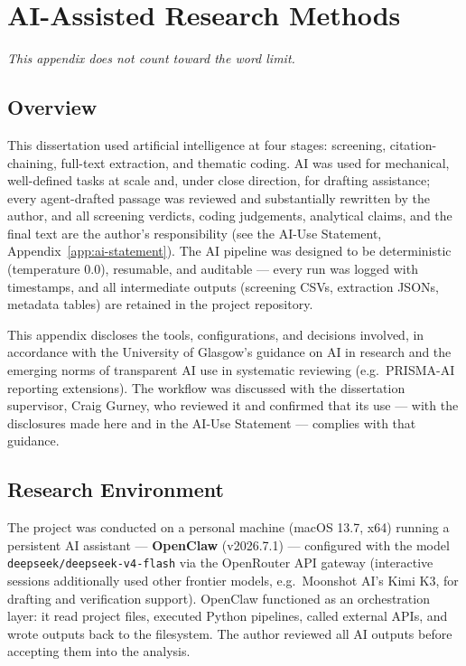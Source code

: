 \chapter{AI-Assisted Research Methods}
\label{app:ai-methods}

\emph{This appendix does not count toward the word limit.}

\section{Overview}

This dissertation used artificial intelligence at four stages: screening, citation-chaining, full-text extraction, and thematic coding. AI was used for mechanical, well-defined tasks at scale and, under close direction, for drafting assistance; every agent-drafted passage was reviewed and substantially rewritten by the author, and all screening verdicts, coding judgements, analytical claims, and the final text are the author's responsibility (see the AI-Use Statement, Appendix~\ref{app:ai-statement}). The AI pipeline was designed to be deterministic (temperature 0.0), resumable, and auditable --- every run was logged with timestamps, and all intermediate outputs (screening CSVs, extraction JSONs, metadata tables) are retained in the project repository.

This appendix discloses the tools, configurations, and decisions involved, in accordance with the University of Glasgow's guidance on AI in research and the emerging norms of transparent AI use in systematic reviewing (e.g.\ PRISMA-AI reporting extensions). The workflow was discussed with the dissertation supervisor, Craig Gurney, who reviewed it and confirmed that its use — with the disclosures made here and in the AI-Use Statement — complies with that guidance.

\section{Research Environment}

The project was conducted on a personal machine (macOS 13.7, x64) running a persistent AI assistant --- \textbf{OpenClaw} (v2026.7.1) --- configured with the model \texttt{deepseek/deepseek-v4-flash} via the OpenRouter API gateway (interactive sessions additionally used other frontier models, e.g.\ Moonshot AI's Kimi K3, for drafting and verification support). OpenClaw functioned as an orchestration layer: it read project files, executed Python pipelines, called external APIs, and wrote outputs back to the filesystem. The author reviewed all AI outputs before accepting them into the analysis.

